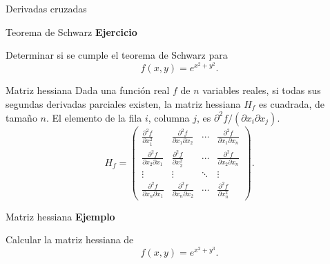 \documentclass[original_version/main.tex]{subfiles}
\begin{document}
\begin{frame}{Derivadas cruzadas}
\begin{center}
\end{center}
\end{frame}
\begin{frame}{Teorema de Schwarz}
\textbf{Ejercicio}\par Determinar si se cumple el teorema de Schwarz para\[f(x,y)=e^{x^2+y^2}.\]
\end{frame}
\begin{frame}{Matriz hessiana}
\small Dada una función real $f$ de $n$ variables reales, si todas sus segundas derivadas parciales existen, la matriz hessiana $H_f$ es cuadrada, de tamaño $n$. El elemento de la fila $i$, columna $j$, es $\partial^2f/(\partial x_i\partial x_j)$.
\[H_f=\begin{pmatrix}
\frac{\partial^2f}{\partial x_1^2}&\frac{\partial^2f}{\partial x_1\partial x_2}&\cdots&\frac{\partial^2f}{\partial x_1\partial x_n}\\
\frac{\partial^2f}{\partial x_2\partial x_1}&\frac{\partial^2f}{\partial x_2^2}&\cdots&\frac{\partial^2f}{\partial x_2\partial x_n}\\
\vdots&\vdots&\ddots&\vdots\\
\frac{\partial^2f}{\partial x_n\partial x_1}&\frac{\partial^2f}{\partial x_n\partial x_2}&\cdots&\frac{\partial^2f}{\partial x_n^2}
\end{pmatrix}.\]
\end{frame}
\begin{frame}{Matriz hessiana}
\textbf{Ejemplo}\par Calcular la matriz hessiana de\[f(x,y)=e^{x^2+y^3}.\]
\end{frame}
\end{document}
